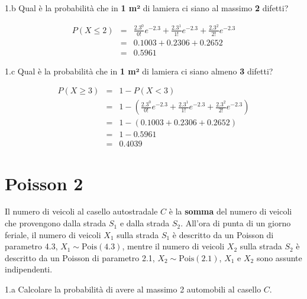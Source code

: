 \documentclass[
  11pt,
]{book}
\theoremstyle{mytheoremstyle}
\theoremstyle{mydefstyle}
\newenvironment{sol}
  {
  \begin{tcolorbox}[enhanced,breakable,arc=0.1mm,boxrule=1pt,colback=white,colframe=iblue,
  title=\bf \fontfamily{lmss}\selectfont \hspace{.5 cm} Soluzione,drop fuzzy shadow]

}{
\end{tcolorbox}
  }
\begin{document}
1.b Qual è la probabilità che in \textbf{1 m²} di lamiera ci siano al massimo \textbf{2} difetti?

\begin{sol}
\begin{eqnarray*}
   P( X \leq 2 ) &=& \frac{ 2.3 ^{ 0 }}{ 0 !}e^{- 2.3 }+\frac{ 2.3 ^{ 1 }}{ 1 !}e^{- 2.3 }+\frac{ 2.3 ^{ 2 }}{ 2 !}e^{- 2.3 } \\                 &=& 0.1003+0.2306+0.2652 \\                 &=& 0.5961 
\end{eqnarray*}

\end{sol}

1.c Qual è la probabilità che in \textbf{1 m²} di lamiera ci siano almeno \textbf{3} difetti?

\begin{sol}
\begin{eqnarray*}
   P( X \geq 3 ) &=& 1-P( X < 3 ) \\                 &=& 1-\left( \frac{ 2.3 ^{ 0 }}{ 0 !}e^{- 2.3 }+\frac{ 2.3 ^{ 1 }}{ 1 !}e^{- 2.3 }+\frac{ 2.3 ^{ 2 }}{ 2 !}e^{- 2.3 } \right)\\                 &=& 1-( 0.1003+0.2306+0.2652 )\\                 &=& 1- 0.5961 \\                 &=&   0.4039 
\end{eqnarray*}

\end{sol}

\section{Poisson 2}\label{poisson-2}

Il numero di veicoli al casello autostradale \(C\) è la \textbf{somma} del numero di veicoli che provengono dalla strada \(S_1\) e dalla strada \(S_2\). All'ora di punta di un giorno feriale, il numero di veicoli \(X_1\) sulla strada \(S_1\) è descritto da un Poisson di parametro 4.3, \(X_1\sim\text{Pois}(4.3)\), mentre il numero di veicoli \(X_2\) sulla strada \(S_2\) è descritto da un Poisson di parametro 2.1, \(X_2\sim\text{Pois}(2.1)\), \(X_1\) e \(X_2\) sono assunte indipendenti.

1.a Calcolare la probabilità di avere al massimo 2 automobili al casello \(C\).
\end{document}
